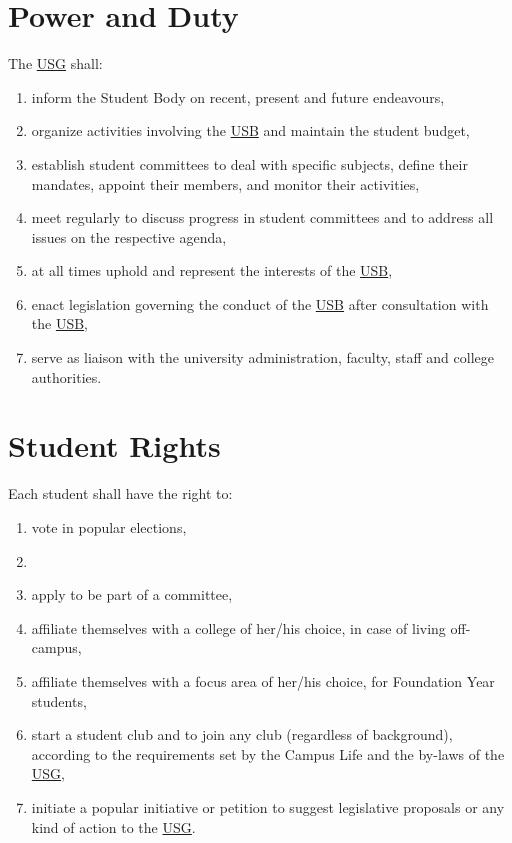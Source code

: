 \section{Power and Duty}
The \hyperref[USGdef]{USG} shall: 
\begin{enumerate}
\item inform the Student Body on recent, present and future endeavours,
\item organize activities involving the \hyperref[studentbody]{USB} and maintain the student budget,
\item establish student committees to deal with specific subjects, define their mandates, appoint their members, and monitor their activities,
\item meet regularly to discuss progress in student committees and to address all issues on the respective agenda,
\item at all times uphold and represent the interests of the \hyperref[studentbody]{USB},
\item enact legislation governing the conduct of the \hyperref[studentbody]{USB} after consultation with the \hyperref[studentbody]{USB},
\item serve as liaison with the university administration, faculty, staff and college authorities.
\end{enumerate}

\section{Student Rights}
Each student shall have the right to:
\begin{enumerate}[nosep] 
\item
vote in popular elections,

\item
{}

\item
apply to be part of a committee,

\item
affiliate themselves with a college of her/his choice, in case of living off-campus,

\item 
affiliate themselves with a focus area of her/his choice, for Foundation Year students,

\item
start a student club and to join any club (regardless of background), according to the requirements set by the Campus Life and the by-laws of the \hyperref[USGdef]{USG},

\item
initiate a popular initiative or petition to suggest legislative proposals or any kind of action to the \hyperref[USGdef]{USG}.
\end{enumerate}

